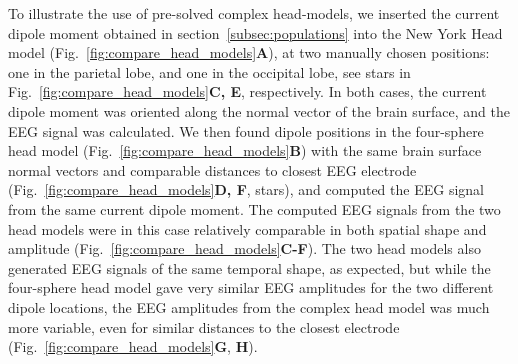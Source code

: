 \documentclass[preprint,10pt,authoryear]{elsarticle}
\newcommand{\hlb}[2][NavyBlue]{ {\sethlcolor{#1} \hl{#2}} }
\newcommand{\hlg}[2][Emerald]{ {\sethlcolor{#1} \hl{#2}} }
\newcommand{\hlp}[2][Purple]{ {\sethlcolor{#1} \hl{#2}} }
\newcommand{\snnote}[1]{\color{white}{\hlb{SN: #1 }}\color{black}}
\newcommand{\tvnnote}[1]{\color{white}{\hlg{TVN: #1 }}\color{black}}
\newcommand{\gen}[1]{\color{white}{\hlp{GTE: #1 }}\color{black}}
\begin{document}

To illustrate the use of pre-solved complex head-models, we inserted the current dipole moment obtained in section~\ref{subsec:populations} into the New York Head model (Fig.~\ref{fig:compare_head_models}\textbf{A}), at two manually chosen positions: one in the parietal lobe, and one in the occipital lobe, see stars in Fig.~\ref{fig:compare_head_models}\textbf{C, E}, respectively.
	In both cases, the current dipole moment was oriented along the normal vector of the brain surface, and the EEG signal was calculated.
	We then found dipole positions in the four-sphere head model (Fig.~\ref{fig:compare_head_models}\textbf{B}) with the same brain surface normal vectors
\gen{Hva menes her?}	
	 and comparable distances to closest EEG electrode (Fig.~\ref{fig:compare_head_models}\textbf{D, F}, stars), and computed the EEG signal from the same current dipole moment. The computed EEG signals from the two head models were in this case relatively comparable in both spatial shape and amplitude (Fig.~\ref{fig:compare_head_models}\textbf{C-F}). The two head models also generated EEG signals of the same temporal shape, as expected, but while the four-sphere head model gave very similar EEG amplitudes for the two different dipole locations, the EEG amplitudes from the complex head model was much more variable, even for similar distances to the closest electrode (Fig.~\ref{fig:compare_head_models}{\bf G}, {\bf H}).
\end{document}
